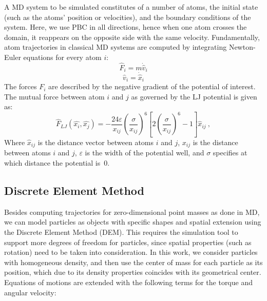 \documentclass[preprint,12pt]{elsarticle}
\begin{document}
A \ac{MD} system to be simulated constitutes of a number of atoms, the initial state (such as the atoms' position or velocities), and the boundary conditions of the system.
Here, we use \ac{PBC} in all directions, hence when one atom crosses the domain, it reappears on the opposite side with the same velocity.
Fundamentally, atom trajectories in classical \ac{MD} systems are computed by integrating Newton-Euler equations for every atom $i$:
\begin{equation}
    \hat F_i = m \dot{\hat v}_i \label{eq:newton_force}
\end{equation}
\begin{equation}
    \hat v_i = \dot{\hat x}_i \label{eq:newton_velocity}
\end{equation}
The forces $F_i$ are described by the negative gradient of the potential of interest.
The mutual force between atom $i$ and $j$ as governed by the \ac{LJ} potential
is given as:
\begin{equation}
    \hat{F}_{LJ}(\hat{x_i}, \hat{x_j}) = -\frac{24\varepsilon}{x_{ij}} \left( \frac{\sigma}{x_{ij}} \right)^{6} \left[ 2\left(\frac{\sigma}{x_{ij}}\right)^{6} - 1\right] \hat{x}_{ij}~,
    \label{eq:lennard_jones}
\end{equation}
Where $\hat{x}_{ij}$ is the distance vector between atoms $i$ and $j$, $x_{ij}$ is the distance between atoms $i$ and $j$, $\varepsilon$ is the width of the potential well, and $\sigma$ specifies at which distance the potential is~$0$.

\subsection{Discrete Element Method}
\label{sec:dem}

Besides computing trajectories for zero-dimensional point masses as done in MD, we can model particles as objects with specific shapes and spatial extension using the Discrete Element Method (DEM).
This requires the simulation tool to support more degrees of freedom for particles, since spatial properties (such as rotation) need to be taken into consideration.
In this work, we consider particles with homogeneous density, and then use the center of mass for each particle as its position, which due to its density properties coincides with its geometrical center.
Equations of motions are extended with the following terms for the torque and angular velocity:
\end{document}
